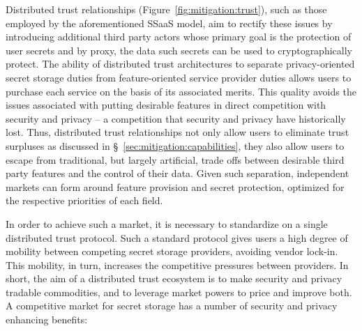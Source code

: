 Distributed trust relationships (Figure~\ref{fig:mitigation:trust}),
such as those employed by the aforementioned SSaaS model, aim to
rectify these issues by introducing additional third party actors
whose primary goal is the protection of user secrets and by proxy, the
data such secrets can be used to cryptographically protect. The
ability of distributed trust architectures to separate
privacy-oriented secret storage duties from feature-oriented service
provider duties allows users to purchase each service on the basis of
its associated merits. This quality avoids the issues associated with
putting desirable features in direct competition with security and
privacy -- a competition that security and privacy have historically
lost. Thus, distributed trust relationships not only allow users to
eliminate trust surpluses as discussed in
\S~\ref{sec:mitigation:capabilities}, they also allow users to escape
from traditional, but largely artificial, trade offs between desirable
third party features and the control of their data. Given such
separation, independent markets can form around feature provision and
secret protection, optimized for the respective priorities of each
field.

In order to achieve such a market, it is necessary to standardize on a
single distributed trust protocol. Such a standard protocol gives
users a high degree of mobility between competing secret storage
providers, avoiding vendor lock-in. This mobility, in turn, increases
the competitive pressures between providers. In short, the aim of a
distributed trust ecosystem is to make security and privacy tradable
commodities, and to leverage market powers to price and improve
both. A competitive market for secret storage has a number of security
and privacy enhancing benefits:

